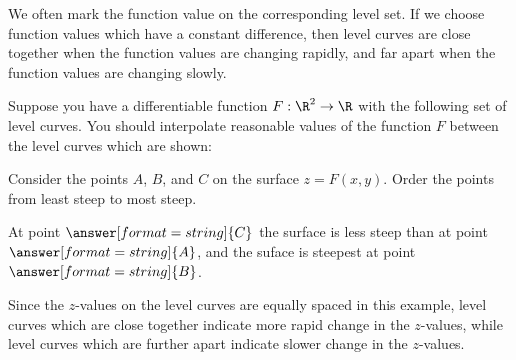 \documentclass{ximera}
\begin{document}
We often mark the function value on the corresponding level set. 
If we choose function values which have a constant difference, then level
curves are close together when the function values are changing rapidly, and
far apart when the function values are changing slowly.

\begin{question}
  Suppose you have a differentiable function $F:\R^2\to\R$ with the following set of
  level curves.  You should interpolate reasonable values of the function $F$  
  between the level curves which are shown:
  \begin{image}
  \end{image}
  Consider the points $A$, $B$, and $C$ on the surface
  $z=F(x,y)$. Order the points from least steep to most steep.


  \begin{prompt}
    At point $\answer[format=string]{C}$ the surface is less steep
    than at point $\answer[format=string]{A}$, and the suface is
    steepest at point $\answer[format=string]{B}$.
    \begin{feedback}
    Since the $z$-values on the level curves are equally spaced in this 
    example, level curves which are close together indicate more rapid 
    change in the $z$-values, while level curves which are further apart 
    indicate slower change in the $z$-values.
    \end{feedback}
  \end{prompt}
\end{question}
\end{document}
